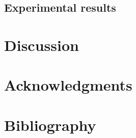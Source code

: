 \documentclass[]{article}
\begin{document}
\hypertarget{sec:results}{%
\subsection{Experimental results}\label{sec:results}}

\hypertarget{discussion}{%
\section{Discussion}\label{discussion}}

\hypertarget{acknowledgments}{%
\section{Acknowledgments}\label{acknowledgments}}

\hypertarget{bibliography}{%
\section{Bibliography}\label{bibliography}}
\end{document}
